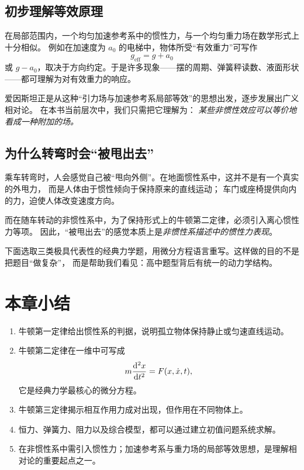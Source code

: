 \subsection{初步理解等效原理}

在局部范围内，一个均匀加速参考系中的惯性力，与一个均匀重力场在数学形式上十分相似。
例如在加速度为 $a_0$ 的电梯中，物体所受“有效重力”可写作
\[
  g_{\text{eff}}=g+a_0
\]
或 $g-a_0$，取决于方向约定。于是许多现象——摆的周期、弹簧秤读数、液面形状——都可理解为对有效重力的响应。

\begin{remark}
爱因斯坦正是从这种“引力场与加速参考系局部等效”的思想出发，逐步发展出广义相对论。
在本书当前层次中，我们只需把它理解为：
\emph{某些非惯性效应可以等价地看成一种附加的场。}
\end{remark}

\subsection{为什么转弯时会“被甩出去”}

乘车转弯时，人会感觉自己被“甩向外侧”。在地面惯性系中，这并不是有一个真实的外甩力，
而是人体由于惯性倾向于保持原来的直线运动；
车门或座椅提供向内的力，迫使人体改变速度方向。

而在随车转动的非惯性系中，为了保持形式上的牛顿第二定律，必须引入离心惯性力等项。
因此，“被甩出去”的感觉本质上是\emph{非惯性系描述中的惯性力表现}。

下面选取三类极具代表性的经典力学题，用微分方程语言重写。这样做的目的不是把题目“做复杂”，
而是帮助我们看见：高中题型背后有统一的动力学结构。

\section*{本章小结}

\begin{enumerate}
  \item 牛顿第一定律给出惯性系的判据，说明孤立物体保持静止或匀速直线运动。
  \item 牛顿第二定律在一维中可写成
  \[
    m\dv[2]{x}{t}=F(x,\dot{x},t),
  \]
  它是经典力学最核心的微分方程。
  \item 牛顿第三定律揭示相互作用力成对出现，但作用在不同物体上。
  \item 恒力、弹簧力、阻力以及综合模型，都可以通过建立初值问题系统求解。
  \item 在非惯性系中需引入惯性力；加速参考系与重力场的局部等效思想，是理解相对论的重要起点之一。
\end{enumerate}


